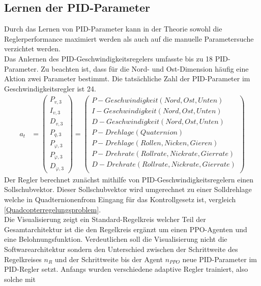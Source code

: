 \subsection{\label{pidlernen}Lernen der PID-Parameter}
Durch das Lernen von PID-Parameter kann in der Theorie sowohl die Reglerperformance maximiert werden als auch auf die manuelle Parametersuche verzichtet werden.\\
Das Anlernen des PID-Geschwindigkeitsregelers umfasste bis zu 18 PID-Parameter. Zu beachten ist, dass für die Nord- und Ost-Dimension häufig eine Aktion zwei Parameter bestimmt. Die tatsächliche Zahl der PID-Parameter im Geschwindigkeitsregler ist 24.
\begin{align}
	a_t &= \begin{pmatrix}
		P_{v,3}\\
		I_{v,3}\\
		D_{v,3}\\
		P_{q,3}\\
		P_{\varphi,3}\\
		P_{\dot{\varphi},3}\\
		D_{\dot{\varphi},3}
	\end{pmatrix}
	= \begin{pmatrix}
		P-Geschwindigkeit (Nord, Ost, Unten)\\
		I-Geschwindigkeit (Nord, Ost, Unten)\\
		D-Geschwindigkeit (Nord, Ost, Unten)\\
		P-Drehlage (Quaternion)\\
		P-Drehlage (Rollen, Nicken, Gieren)\\
		P-Drehrate (Rollrate, Nickrate, Gierrate)\\
		D-Drehrate (Rollrate, Nickrate, Gierrate)\\
	\end{pmatrix}
\end{align}
Der Regler berechnet zunächst mithilfe von PID-Geschwindigkeitsregelern einen Sollschubvektor. Dieser Sollschubvektor wird umgerechnet zu einer Solldrehlage welche in Quadternionenfrom Eingang für das Kontrollgesetz ist, vergleich \ref{Quadcopterregelungsproblem}.\\
Die Visualisierung zeigt ein Standard-Regelkreis welcher Teil der Gesamtarchitektur ist die den Regelkreis ergänzt um einen PPO-Agenten und eine Belohnungsfunktion. Verdeutlichen soll die Visualisierung nicht die Softwarearchitektur sondern den Unterschied zwischen der Schrittweite des Regelkreises $n_R$ und der Schrittweite bis der Agent $n_{PPO}$ neue PID-Parameter im PID-Regler setzt. Anfangs wurden verschiedene adaptive Regler trainiert, also solche mit 

